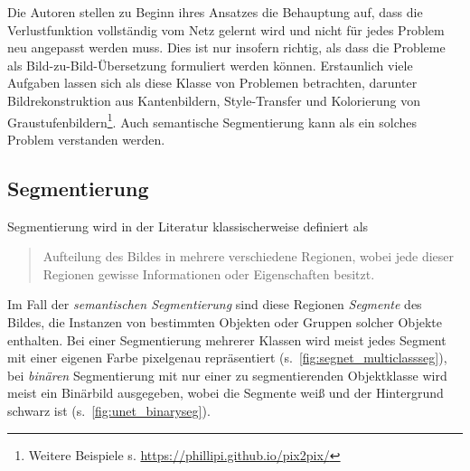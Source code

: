 Die Autoren stellen zu Beginn ihres Ansatzes die Behauptung auf, dass die Verlustfunktion vollständig vom Netz gelernt wird und nicht für jedes Problem neu angepasst werden muss.
Dies ist nur insofern richtig, als dass die Probleme als Bild-zu-Bild-Übersetzung formuliert werden können.
Erstaunlich viele Aufgaben lassen sich als diese Klasse von Problemen betrachten, darunter Bildrekonstruktion aus Kantenbildern, Style-Transfer und Kolorierung von Graustufenbildern\footnote{Weitere Beispiele s. \url{https://phillipi.github.io/pix2pix/}}.
Auch semantische Segmentierung kann als ein solches Problem verstanden werden.



\subsection{Segmentierung}

Segmentierung wird in der Literatur klassischerweise definiert als

\begin{quote}Aufteilung des Bildes in mehrere verschiedene Regionen, wobei jede dieser Regionen gewisse Informationen oder Eigenschaften besitzt.~\cite[S.~29]{Ens.2011}\end{quote}

Im Fall der \emph{semantischen Segmentierung} sind diese Regionen \emph{Segmente} des Bildes, die Instanzen von bestimmten Objekten oder Gruppen solcher Objekte enthalten.
Bei einer Segmentierung mehrerer Klassen wird meist jedes Segment mit einer eigenen Farbe pixelgenau repräsentiert (s.~\autoref{fig:segnet_multiclassseg}), bei \emph{binären} Segmentierung mit nur einer zu segmentierenden Objektklasse wird meist ein Binärbild ausgegeben, wobei die Segmente weiß und der Hintergrund schwarz ist (s.~\autoref{fig:unet_binaryseg}).

